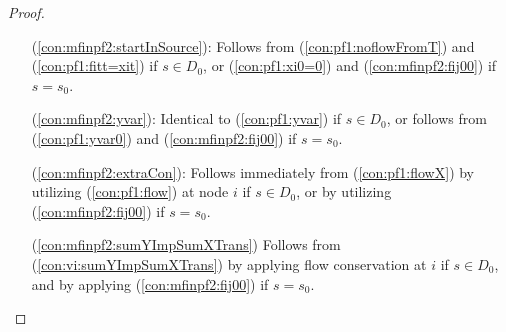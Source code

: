 \begin{proof}
\begin{itemize}[leftmargin=1cm]
\begin{align}
x_{ij} > \sum\limits_{k \in V_i\setminus\{j\}}x_{ki}.\label{eq:assumContr}
\end{align}
The proof is divided into two parts that capture the two cases stated by Lemma \ref{lem:xequals}. Assume first that (L.4a) holds. We have that $\exists t\in D_0 \text{ s. t. }f^t_{ij}=x_{ij}$.
Besides the strict inequality, assumption (\ref{eq:assumContr}) also implies $x_{ij}> 0$ which together with Lemma \ref{lem:onedir} gives $f^t_{ji}=0$. By applying (\ref{con:pf1:xfrel}) to arcs entering $i$,
$$\sum\limits_{k\in V_i}f^t_{ik} \geq f^t_{ij}=x_{ij}>\sum\limits_{k \in V_i\setminus\{j\}}x_{ki} \geq \sum\limits_{k \in V_i\setminus\{j\}}f^t_{ki}=\sum\limits_{k \in V_i}f^t_{ki},$$
contradicting flow conservation constraints (\ref{con:pf1:flow}).
Assume next that (L.4a) does not hold, i.e., $f^*_{ij}<x_{ij}$. We know from Lemma \ref{lem:oneslack} that $x_{ji}=f^*_{ji}$, and so $\exists t\in D_0 \text{ s. t. }f^t_{ji}=x_{ji}$. Moreover, Lemma \ref{lem:onedir} says that if for some $s\in D_0: f^s_{ji}>0$, then $f^s_{ij} = 0$, i.e. any flow that enters $i$ via $(j,i)$ must leave it through an arc different from $(i,j)$. Together with the flow conservation and (\ref{con:pf1:xfrel}),
$$
x_{ji}=f^t_{ji}\leq\sum_{k\in V_i}f^t_{ik}=\sum_{k\in V_i\setminus\{j\}}f^t_{ik}\leq\sum_{k\in V_i\setminus\{j\}}x_{ik}.
$$
Note that for $x_{ji}=f^t_{ji}=0$, $f^t_{ij}\geq 0$ in which case the second equality above would not hold, but we could directly write $x_{ji}\leq\sum_{k\in V_i\setminus\{j\}}x_{ik}$. Combined with the assumption (\ref{eq:assumContr}) we obtain
$$
\sum_{k\in V_i}x_{ki} = x_{ji} + \sum_{k\in V_i\setminus\{j\}}x_{ki}<x_{ij} + \sum_{k\in V_i\setminus\{j\}}x_{ik} = \sum_{k\in V_i}x_{ik},
$$
contradicting (L.4b), and thereby Lemma \ref{lem:xequals}. The proof applies with minor simplifications also for $s=s_0$.
\item[ (\ref{con:mfinpf2:startInSource}):] Follows from (\ref{con:pf1:noflowFromT}) and (\ref{con:pf1:fitt=xit}) if $s\in D_0$, or (\ref{con:pf1:xi0=0}) and (\ref{con:mfinpf2:fij00}) if $s=s_0$.
\item[ (\ref{con:mfinpf2:yvar}):] Identical to (\ref{con:pf1:yvar}) if $s\in D_0$, or follows from (\ref{con:pf1:yvar0}) and (\ref{con:mfinpf2:fij00}) if $s=s_0$.
\item[ (\ref{con:mfinpf2:extraCon}):] Follows immediately from (\ref{con:pf1:flowX}) by utilizing (\ref{con:pf1:flow}) at node $i$ if $s\in D_0$, or by utilizing (\ref{con:mfinpf2:fij00}) if $s=s_0$.
\item[(\ref{con:mfinpf2:sumYImpSumXTrans})] Follows from (\ref{con:vi:sumYImpSumXTrans}) by applying flow conservation at $i$ if $s\in D_0$, and by applying (\ref{con:mfinpf2:fij00}) if $s=s_0$. 

\end{itemize}
\end{proof}
